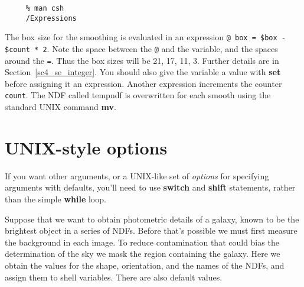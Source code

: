 \documentclass[twoside,11pt]{article}
\newcommand{\htmlref}[2]{#1}
\newcommand{\xref}[3]{#1}
\newcommand{\xlabel}[1]{}
\newcommand{\latexelsehtml}[2]{#1}
\newcommand{\latexelsehtml}[2]{#2}
\newcommand{\NDFref}[1]{\xref{#1}{sun33}{}}
\begin{document}
\small
\begin{verbatim}
     % man csh
     /Expressions
\end{verbatim}
\normalsize

The box size for the smoothing is evaluated in an expression
\mbox{\tt @ box = \$box - \$count * 2}.  Note the space between the
{\tt @} and the variable, and the spaces around the {\tt =}.  Thus
the box sizes will be 21, 17, 11, 3.  Further details are 
\latexelsehtml{in
Section~\ref{sc4_se_integer}.}{\htmlref{here}{sc4_se_integer}.}
You should also give the variable a value with {\bf set} before
assigning it an expression.  Another expression increments the counter
{\tt count}.  The NDF called tempndf is overwritten for each smooth
using the standard UNIX command {\bf mv}.

\newpage
\section{\xlabel{sc4_se_unix_options}UNIX-style options
\label{sc4_se_unix_options}}

If you want other arguments, or a UNIX-like set of {\em options\/}
for specifying arguments with defaults, you'll need to use {\bf switch}
and {\bf shift} statements, rather than the simple {\bf while} loop.

Suppose that we want to obtain photometric details of a galaxy, known
to be the brightest object in a series of \NDFref{{\sf NDF}s}.  Before
that's possible we must first measure the background in each image.
To reduce contamination that could bias the determination of the sky
we mask the region containing the galaxy.  Here we obtain the values
for the shape, orientation, and the names of the NDFs, and assign them
to \htmlref{shell variables}{sc4_se_variables}.  There are also default values.
\end{document}
